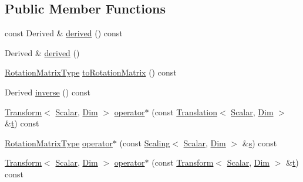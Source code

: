 \subsection*{Public Member Functions}
\begin{DoxyCompactItemize}
\item 
const Derived \& \hyperlink{class_rotation_base_a63603aebdd9b50e48c82221e0b2eb653}{derived} () const 
\item 
Derived \& \hyperlink{class_rotation_base_a2f27534a046655a2ec9b19fd724ef4ec}{derived} ()
\item 
\hyperlink{class_rotation_base_a0f1d2a93b35fbb954e587ab655d68d31}{Rotation\-Matrix\-Type} \hyperlink{class_rotation_base_a0558b1c87969649f24b382d7278d738f}{to\-Rotation\-Matrix} () const 
\item 
Derived \hyperlink{class_rotation_base_a7fcf6d9c6522daa617f0b4500022d83b}{inverse} () const 
\item 
\hyperlink{class_transform}{Transform}$<$ \hyperlink{class_rotation_base_ae9cbe0a3a87dfe2fa70958d9fe948a09}{Scalar}, \hyperlink{class_rotation_base_aef5b1b1e75f2a8791e700e70c36b6bc6a461876d0cdf2fd5c72b83070d017c212}{Dim} $>$ \hyperlink{class_rotation_base_a6695e2354bf35619a2f08bcd7cd23dfa}{operator$\ast$} (const \hyperlink{class_translation}{Translation}$<$ \hyperlink{class_rotation_base_ae9cbe0a3a87dfe2fa70958d9fe948a09}{Scalar}, \hyperlink{class_rotation_base_aef5b1b1e75f2a8791e700e70c36b6bc6a461876d0cdf2fd5c72b83070d017c212}{Dim} $>$ \&\hyperlink{glext_8h_a00140d6f5c548b26daf170bf16e86a6d}{t}) const 
\item 
\hyperlink{class_rotation_base_a0f1d2a93b35fbb954e587ab655d68d31}{Rotation\-Matrix\-Type} \hyperlink{class_rotation_base_ab70e2885d1f7ae6a52cf0594d0f6c9ce}{operator$\ast$} (const \hyperlink{class_scaling}{Scaling}$<$ \hyperlink{class_rotation_base_ae9cbe0a3a87dfe2fa70958d9fe948a09}{Scalar}, \hyperlink{class_rotation_base_aef5b1b1e75f2a8791e700e70c36b6bc6a461876d0cdf2fd5c72b83070d017c212}{Dim} $>$ \&\hyperlink{glext_8h_ad585a1393cfa368fa9dc3d8ebff640d5}{s}) const 
\item 
\hyperlink{class_transform}{Transform}$<$ \hyperlink{class_rotation_base_ae9cbe0a3a87dfe2fa70958d9fe948a09}{Scalar}, \hyperlink{class_rotation_base_aef5b1b1e75f2a8791e700e70c36b6bc6a461876d0cdf2fd5c72b83070d017c212}{Dim} $>$ \hyperlink{class_rotation_base_aef331704083d347f0ea0eff7ebf59e89}{operator$\ast$} (const \hyperlink{class_transform}{Transform}$<$ \hyperlink{class_rotation_base_ae9cbe0a3a87dfe2fa70958d9fe948a09}{Scalar}, \hyperlink{class_rotation_base_aef5b1b1e75f2a8791e700e70c36b6bc6a461876d0cdf2fd5c72b83070d017c212}{Dim} $>$ \&\hyperlink{glext_8h_a00140d6f5c548b26daf170bf16e86a6d}{t}) const 
\end{DoxyCompactItemize}


